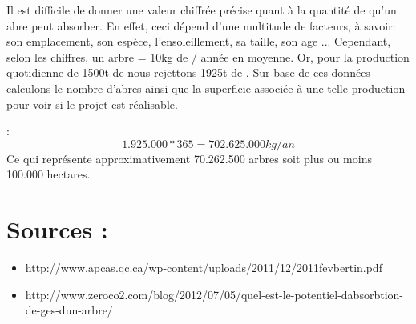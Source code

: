 \documentclass[10pt,a4paper]{article}
\begin{document}
Il est difficile de donner une valeur chiffrée précise quant à la quantité de  qu'un abre peut absorber. En effet, ceci dépend d'une multitude de facteurs, à savoir: son emplacement, son espèce, l'ensoleillement, sa taille, son age ... Cependant, selon les chiffres, un arbre = 10kg de  / année en moyenne.
Or, pour la production quotidienne de 1500t de  nous rejettons 1925t de .
Sur base de ces données calculons le nombre d'abres ainsi que la superficie associée à une telle production pour voir si le projet est réalisable.

 : $$1.925.000 * 365 = 702.625.000kg/an $$ 
Ce qui représente approximativement 70.262.500 arbres soit plus ou moins 100.000 hectares.



\section{Sources :}

\begin{itemize}
\item http://www.apcas.qc.ca/wp-content/uploads/2011/12/2011fevbertin.pdf
\item http://www.zeroco2.com/blog/2012/07/05/quel-est-le-potentiel-dabsorbtion-de-ges-dun-arbre/
\end{itemize}
\end{document}
